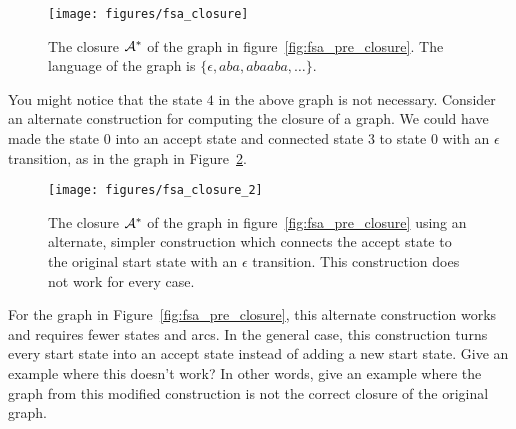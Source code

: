 \begin{figure}
    \centering
    \texttt{[image: figures/fsa\_closure]}
    \caption{The closure $\mathcal{A}^*$ of the graph in
    figure~\ref{fig:fsa_pre_closure}. The language of the graph is $\{\epsilon,
    aba, abaaba, \ldots\}$.}
    \label{fig:fsa_closure}
\end{figure}

\begin{example}
You might notice that the state $4$ in the above graph is not necessary.
Consider an alternate construction for computing the closure of a graph. We
could have made the state $0$ into an accept state and connected state $3$
to state $0$ with an $\epsilon$ transition, as in the graph in
Figure~\ref{fig:fsa_closure_2}.

\begin{figure}
    \centering
    \texttt{[image: figures/fsa\_closure\_2]}
    \caption{The closure $\mathcal{A}^*$ of the graph in
    figure~\ref{fig:fsa_pre_closure} using an alternate, simpler construction
    which connects the accept state to the original start state with an
    $\epsilon$ transition. This construction does not work for every case.}
    \label{fig:fsa_closure_2}
\end{figure}

For the graph in Figure~\ref{fig:fsa_pre_closure}, this alternate construction
works and requires fewer states and arcs. In the general case, this
construction turns every start state into an accept state instead of adding
a new start state. Give an example where this doesn't work? In other words,
give an example where the graph from this modified construction is not the
correct closure of the original graph.
\end{example}

